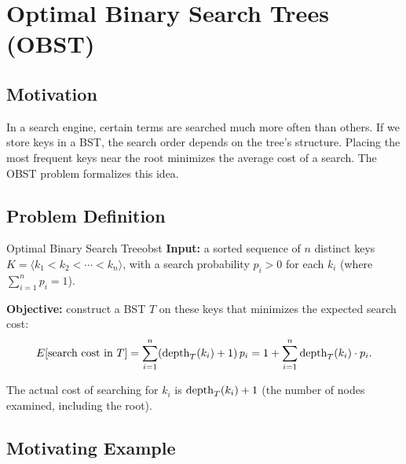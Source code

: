 
\section*{Optimal Binary Search Trees (OBST)}

\subsection{Motivation}

In a search engine, certain terms are searched much more often than others. If we
store keys in a BST, the search order depends on the tree's structure. Placing the
most frequent keys near the root minimizes the average cost of a search. The OBST
problem formalizes this idea.

\subsection{Problem Definition}

\begin{definition}{Optimal Binary Search Tree}{obst}
\textbf{Input:} a sorted sequence of $n$ distinct keys
$K = \langle k_1 < k_2 < \cdots < k_n \rangle$, with a search probability 
$p_i > 0$ for each $k_i$ (where $\sum_{i=1}^n p_i = 1$).

\textbf{Objective:} construct a BST $T$ on these keys that minimizes the expected
search cost:
\[
  E[\text{search cost in } T]
  = \sum_{i=1}^{n} (\operatorname{depth}_T(k_i) + 1)\, p_i
  = 1 + \sum_{i=1}^{n} \operatorname{depth}_T(k_i)\cdot p_i.
\]
\end{definition}

The actual cost of searching for $k_i$ is $\operatorname{depth}_T(k_i) + 1$ (the number of nodes
examined, including the root).

\subsection{Motivating Example}

